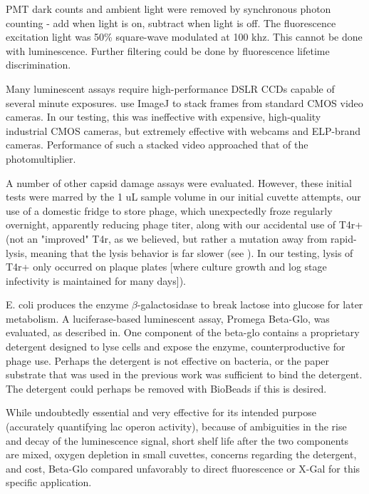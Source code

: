 \documentclass[paper.tex]{subfiles}
\begin{document}
\begin{multicols}{1}
PMT dark counts and ambient light were removed by synchronous photon counting\cite{Measurement1966} - add when light is on, subtract when light is off. The fluorescence excitation light was 50\% square-wave modulated at 100 khz.  This cannot be done with luminescence. Further filtering could be done by fluorescence lifetime discrimination. 

Many luminescent assays require high-performance DSLR CCDs capable of several minute exposures. \cite{Image2012} use ImageJ\cite{NIH2012} to stack frames from standard CMOS video cameras. In our testing, this was ineffective with expensive, high-quality industrial CMOS cameras, but extremely effective with webcams and ELP-brand cameras. Performance of such a stacked video approached that of the photomultiplier. 

A number of other capsid damage assays were evaluated. However, these initial tests were marred by the 1 uL sample volume in our initial cuvette attempts, our use of a domestic fridge to store phage, which unexpectedly froze regularly overnight, apparently reducing phage titer, along with our accidental use of T4r+ (not an "improved" T4r, as we believed, but rather a mutation away from rapid-lysis, meaning that the lysis behavior is far slower (see \cite{Spontaneous1946}). In our testing, lysis of T4r+ only occurred on plaque plates [where culture growth and log stage infectivity is maintained for many days]). 


E. coli produces the enzyme $\beta$-galactosidase to break lactose into glucose for later metabolism. A luciferase-based luminescent assay, Promega Beta-Glo, was evaluated, as described in\cite{rapid2014}. One component of the beta-glo contains a proprietary detergent designed to lyse cells\cite{BETAGLO2003} and expose the enzyme, counterproductive for phage use. Perhaps the detergent is not effective on bacteria, or the paper substrate that was used in the previous work was sufficient to bind the detergent. The detergent could perhaps be removed with BioBeads if this is desired.
 
While undoubtedly essential and very effective for its intended purpose (accurately quantifying lac operon activity), because of ambiguities in the rise and decay of the luminescence signal, short shelf life after the two components are mixed, oxygen depletion in small cuvettes, concerns regarding the detergent, and cost, Beta-Glo compared unfavorably to direct fluorescence or X-Gal for this specific application.


\end{multicols}
\end{document}
